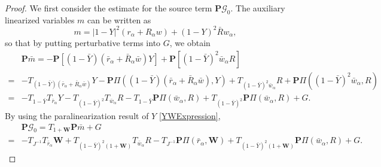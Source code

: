 \documentclass[10pt]{amsart}
\theoremstyle{remark}
\theoremstyle{definition}
\numberwithin{equation}{section}
\newcommand{\bw}{\mathbf{W}}
\newcommand{\nP}{{\mathbf P}}
\begin{document}
\begin{proof}
We first consider the estimate for the source term $\nP \mathcal{G}_0$.
The auxiliary linearized variables $m$ can be written as
\begin{equation*}
m = |1-Y|^2(r_\alpha +R_\alpha w)+(1-Y)^2\bar{R}w_\alpha,
\end{equation*}
so that by putting perturbative terms into $G$, we obtain
\begin{align*}
&\nP \bar{m} = -\nP[(1-\bar{Y})(\bar{r}_\alpha + \bar{R}_\alpha \bar{w})Y] + \nP[(1-\bar{Y})^2\bar{w}_\alpha R] \\
=& -T_{(1-\bar{Y})(\bar{r}_\alpha + \bar{R}_\alpha \bar{w})}Y -\nP \Pi((1-\bar{Y})(\bar{r}_\alpha + \bar{R}_\alpha \bar{w}), Y) + T_{(1-\bar{Y})^2\bar{w}_\alpha}R + \nP\Pi((1-\bar{Y})^2\bar{w}_\alpha, R)\\
=& - T_{1-\bar{Y}}T_{\bar{r}_\alpha}Y - T_{(1-\bar{Y})^2}T_{\bar{w}_\alpha}R - T_{1-\bar{Y}}\nP\Pi(\bar{w}_\alpha, R)+ T_{(1-\bar{Y})^2}\nP\Pi(\bar{w}_\alpha, R) + G.
\end{align*}
By using the paralinearization result of $Y$ \eqref{YWExpression},
\begin{align*}
    &\nP \mathcal{G}_0 = T_{1+\bw} \nP \bar{m} + G \\
    =& -T_{J^{-1}}T_{\bar{r}_\alpha}\bw +  T_{(1-\bar{Y})^2(1+\bw)}T_{\bar{w}_\alpha} R - T_{J^{-1}} \nP \Pi(\bar{r}_\alpha, \bw) +  T_{(1-\bar{Y})^2(1+\bw)} \nP \Pi(\bar{w}_\alpha, R) + G.
\end{align*}


\end{proof}
\end{document}
